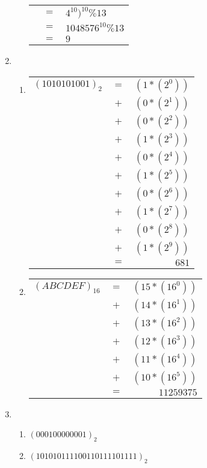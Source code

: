 \documentclass[8pt,a4paper]{article}
\begin{document}
\begin{enumerate}[itemsep=20pt]
\begin{enumerate}
\begin{tabular}[t]{ r c l}
								 & \(=\) & \(4^10)^{10}\%13\) \\
								 & \(=\) & \(1048576^{10}\%13\)\\
								 & \(=\) & \(9\)\\
			\end{tabular}
	\end{enumerate}
\item
	\begin{enumerate}
		\item	
			\begin{tabular}[t]{l c r}
			\((1010101001)_2\)	& \(=\) & \((1*(2^0))\) \\
								& \(+\) & \((0*(2^1))\) \\
								& \(+\) & \((0*(2^2))\) \\
								& \(+\) & \((1*(2^3))\) \\
								& \(+\) & \((0*(2^4))\) \\
								& \(+\) & \((1*(2^5))\) \\
								& \(+\) & \((0*(2^6))\) \\
								& \(+\) & \((1*(2^7))\) \\
								& \(+\) & \((0*(2^8))\) \\
				 				& \(+\) & \((1*(2^9))\)\\
				 				& \(=\) & \( 681\)\\
			\end{tabular}
		\item
			\begin{tabular}[t]{l c r}
				\((ABCDEF)_16\) & \(=\) & \((15*(16^0))\)\\
								& \(+\) & \((14*(16^1))\)\\
								& \(+\) & \((13*(16^2))\)\\
								& \(+\) & \((12*(16^3))\)\\
								& \(+\) & \((11*(16^4))\)\\
								& \(+\) & \((10*(16^5))\)\\
								& \(=\) & \(11259375\)\\
			\end{tabular}
	\end{enumerate}
\item
	\begin{enumerate}
		\item
			$(0001 0000 0001)_2$\\
		\item
			$(1010 1011 1100 1101 1110 1111)_2$\\
	\end{enumerate}

\end{enumerate}
\end{document}
